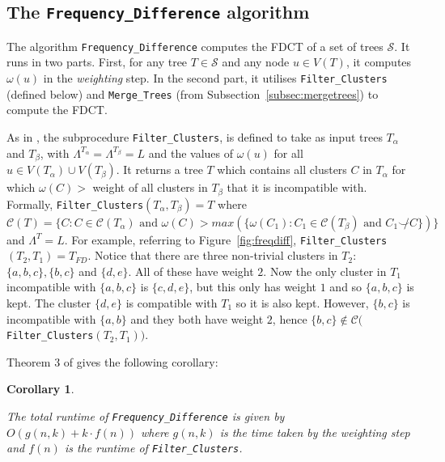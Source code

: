 \documentclass{article}
\newcommand{\compatible}{\smile}
\newcommand{\leafset}{\Lambda}
\newcommand{\weight}{\omega}
\newcommand{\TA}{T_\alpha}
\newcommand{\TB}{T_\beta}
\newtheorem{freqdiffruntimecomponents}[incompatibility]{Corollary}
\begin{document}
    \subsection{The \texttt{Frequency\_Difference} algorithm}

    The algorithm \texttt{Frequency\_Difference} \cite{jansson2018algorithms} computes the FDCT of a set of trees $\mathcal{S}$. It runs in two parts. First, for any tree $T \in \mathcal{S}$ and any node $u \in V(T)$, it computes $\weight(u)$ in the \textit{weighting} step. In the second part, it utilises \texttt{Filter\_Clusters} (defined below) and \texttt{Merge\_Trees} (from Subsection~\ref{subsec:mergetrees}) to compute the FDCT.

    As in \cite{jansson2018algorithms}, the subprocedure \texttt{Filter\_Clusters}, is defined to take as input trees $\TA$ and $\TB$, with $\leafset^{\TA} = \leafset^{\TB} = L$ and the values of $\weight(u)$ for all $u \in V(\TA) \cup V(\TB)$. It returns a tree $T$ which contains all clusters $C$ in $\TA$ for which $\weight(C) > $ weight of all clusters in $\TB$ that it is incompatible with. Formally, \texttt{Filter\_Clusters}$(\TA, \TB) = T$ where $\mathcal{C}(T) = \{C : C \in \mathcal{C}(\TA) \text{ and } \weight(C) > max(\{\weight(C_1) : C_1 \in \mathcal{C}(\TB) \text{ and } C_1 \not\compatible C\})\}$ and $\leafset^T = L$. For example, referring to Figure~\ref{fig:freqdiff}, \texttt{Filter\_Clusters}$(T_2, T_1) = T_{FD}$. Notice that there are three non-trivial clusters in $T_2$: $\{a, b, c\}, \{b, c\}$ and $\{d, e\}$. All of these have weight $2$. Now the only cluster in $T_1$ incompatible with $\{a, b, c\}$ is $\{c, d, e\}$, but this only has weight $1$ and so $\{a, b, c\}$ is kept. The cluster $\{d, e\}$ is compatible with $T_1$ so it is also kept. However, $\{b, c\}$ is incompatible with $\{a, b\}$ and they both have weight $2$, hence $\{b, c\} \not\in \mathcal{C}($\texttt{Filter\_Clusters}$(T_2, T_1))$.

    Theorem 3 of \cite{jansson2018algorithms} gives the following corollary:
    \newline

    \begin{freqdiffruntimecomponents}
        \label{cor:freqdiffruntimecomponents}

        The total runtime of \texttt{Frequency\_Difference} is given by $O(g(n, k) + k \cdot f(n))$ where $g(n, k)$ is the time taken by the weighting step and $f(n)$ is the runtime of \texttt{Filter\_Clusters}.
    \end{freqdiffruntimecomponents}
\end{document}
